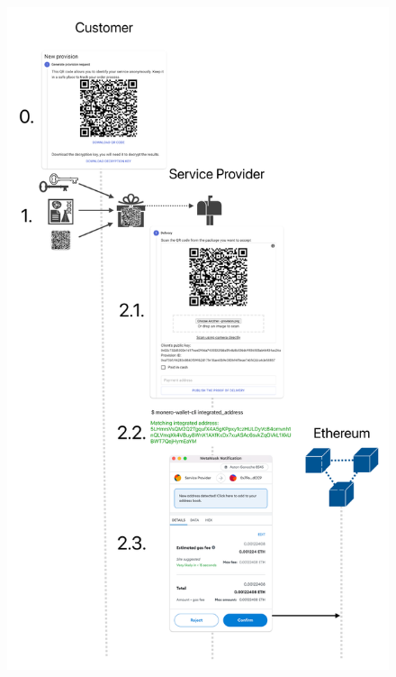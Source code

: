 \documentclass{ieeeaccess}
\begin{document}
\begin{figure}[ht]
  \begin{center}
  \includegraphics[width=\textwidth,height=\textheight,keepaspectratio]{anonser-experiment1.pdf}
  \end{center}
\end{figure}
\end{document}
